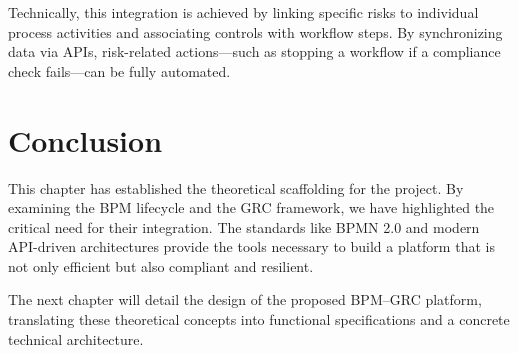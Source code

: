 Technically, this integration is achieved by linking specific risks to individual process activities and associating controls with workflow steps. By synchronizing data via APIs, risk-related actions—such as stopping a workflow if a compliance check fails—can be fully automated.

\section{Conclusion}

This chapter has established the theoretical scaffolding for the project. By examining the BPM lifecycle and the GRC framework, we have highlighted the critical need for their integration. The standards like BPMN 2.0 and modern API-driven architectures provide the tools necessary to build a platform that is not only efficient but also compliant and resilient.

The next chapter will detail the design of the proposed BPM--GRC platform, translating these theoretical concepts into functional specifications and a concrete technical architecture.
